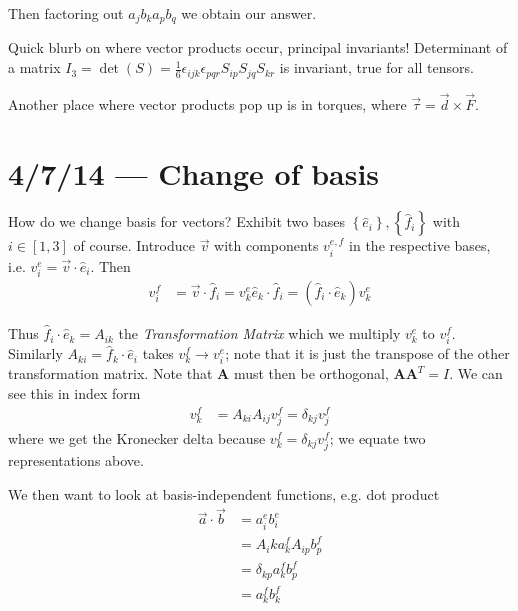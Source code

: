 \documentclass[10pt]{report}
\begin{document}
Then factoring out $a_jb_ka_pb_q$ we obtain our answer.

Quick blurb on where vector products occur, principal invariants! Determinant of a matrix $I_3 = \det(S) = \frac{1}{6}\epsilon_{ijk}\epsilon_{pqr}S_{ip}S_{jq}S_{kr}$ is invariant, true for all tensors.

Another place where vector products pop up is in torques, where $\vec{\tau} = \vec{d}\times \vec{F}$.

\chapter{4/7/14 --- Change of basis}

How do we change basis for vectors? Exhibit two bases $\left\{ \hat{e} _i \right\}, \left\{ \hat{f} _i \right\}$ with $i \in [1,3]$ of course. Introduce $\vec{v}$ with components $v_i^{e,f}$ in the respective bases, i.e. $v_i^e = \vec{v}\cdot \hat{e}_i$. Then
\begin{align}
    v_i^f &= \vec{v}\cdot\hat{f}_i = v_k^e\hat{e}_k\cdot \hat{f}_i = \left( \hat{f}_i\cdot \hat{e}_k   \right)v_k^e   
\end{align}

Thus $\hat{f}_i\cdot \hat{e}_k = A_{ik}$ the \emph{Transformation Matrix} which we multiply $v_k^e$ to $v_i^f$. Similarly $A_{ki} = \hat{f}_k\cdot \hat{e}_i$ takes $v_k^f \to v_i^e$; note that it is just the transpose of the other transformation matrix. Note that $\mathbf{A}$ must then be orthogonal, $\mathbf{A}\mathbf{A}^T = I$. We can see this in index form
\begin{align}
    v_k^f &= A_{ki}A_{ij}v_j^f = \delta_{kj}v_j^f
\end{align}
where we get the Kronecker delta because $v_k^f = \delta_{kj}v_j^f$; we equate two representations above.

We then want to look at basis-independent functions, e.g. dot product
\begin{align}
    \vec{a}\cdot\vec{b} &= a_i^e b_i^e\\
    &= A_ika_k^fA_{ip}b_p^f\\
    &= \delta_{kp}a_k^fb_p^f\\
    &= a_k^fb_k^f
\end{align}
\end{document}
